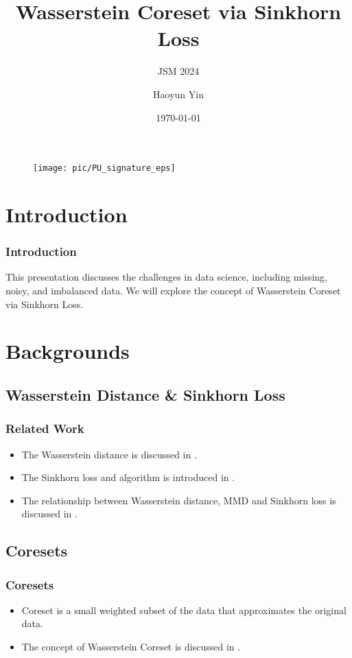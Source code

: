 \documentclass{beamer}
\author{Haoyun Yin}
\title{Wasserstein Coreset via Sinkhorn Loss}
\subtitle{JSM 2024}
\institute{Department of Statistics, Purdue University}
\date{\today}
\begin{document}
\begin{frame}
    \titlepage
    \begin{figure}[htpb]
        \begin{center}
            \texttt{[image: pic/PU\_signature\_eps]}
        \end{center}
    \end{figure}
\end{frame}

\begin{frame}
\tableofcontents[sectionstyle=show,
subsectionstyle=show/shaded/hide,
subsubsectionstyle=show/shaded/hide]
\end{frame}

\section{Introduction}

\begin{frame}
\frametitle{Introduction}
This presentation discusses the challenges in data science, including missing, noisy, and imbalanced data. We will explore the concept of Wasserstein Coreset via Sinkhorn Loss.

\end{frame}

\section{Backgrounds}
\subsection{Wasserstein Distance \& Sinkhorn Loss}
\begin{frame}[<+->]
\frametitle{Related Work}
\begin{itemize}
\item The Wasserstein distance is discussed in \citep{villani2009optimal}.
\item The Sinkhorn loss and algorithm is introduced in \citep{cuturi2013sinkhorn}.
\item The relationship between Wasserstein distance, MMD and Sinkhorn loss is discussed in \citep{feydy2019interpolating}.
\end{itemize}
\end{frame}

\subsection{Coresets}
\begin{frame}[<+->]
\frametitle{Coresets}
\begin{itemize}
    \item Coreset is a small weighted subset of the data that approximates the original data.
    \item The concept of Wasserstein Coreset is discussed in \citep{ClaiciSebastian2018WMC}.
\end{itemize}
\end{frame}
\end{document}
